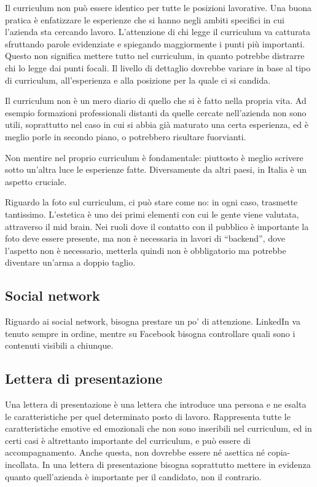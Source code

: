 Il curriculum non può essere identico per tutte le posizioni lavorative. Una
buona pratica è enfatizzare le esperienze che si hanno negli ambiti specifici
in cui l'azienda sta cercando lavoro. L'attenzione di chi legge il curriculum
va catturata sfruttando parole evidenziate e spiegando maggiormente i punti più
importanti. Questo non significa mettere tutto nel curriculum, in quanto
potrebbe distrarre chi lo legge dai punti focali. Il livello di dettaglio
dovrebbe variare in base al tipo di curriculum, all'esperienza e alla posizione
per la quale ci si candida.

Il curriculum non è un mero diario di quello che si è fatto nella propria vita.
Ad esempio formazioni professionali distanti da quelle cercate nell'azienda non
sono utili, soprattutto nel caso in cui si abbia già maturato una certa
esperienza, ed è meglio porle in secondo piano, o potrebbero risultare
fuorvianti.

Non mentire nel proprio curriculum è fondamentale: piuttosto è
meglio scrivere sotto un'altra luce le esperienze fatte. Diversamente da altri
paesi, in Italia è un aspetto cruciale.

Riguardo la foto sul curriculum, ci può stare come no: in ogni caso, trasmette
tantissimo. L'estetica è uno dei primi elementi con cui le gente viene
valutata, attraverso il mid brain. Nei ruoli dove il contatto con il pubblico è
importante la foto deve essere presente, ma non è necessaria in lavori di
``backend'', dove l'aspetto non è necessario, metterla quindi non è
obbligatorio ma potrebbe diventare un'arma a doppio taglio.

\subsection{Social network}
Riguardo ai social network, bisogna prestare un po' di attenzione. LinkedIn va
tenuto sempre in ordine, mentre su Facebook bisogna controllare quali sono i
contenuti visibili a chiunque.

\subsection{Lettera di presentazione}
Una lettera di presentazione è una lettera che introduce una persona e ne
esalta le caratteristiche per quel determinato posto di lavoro. Rappresenta
tutte le caratteristiche emotive ed emozionali che non sono inseribili nel
curriculum, ed in certi casi è altrettanto importante del curriculum, e
può essere di accompagnamento. Anche questa, non dovrebbe essere né asettica né
copia-incollata. In una lettera di presentazione bisogna soprattutto mettere in
evidenza quanto quell'azienda è importante per il candidato, non il contrario.

